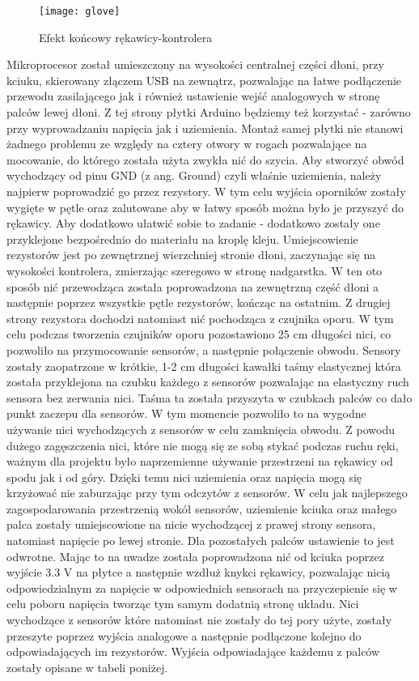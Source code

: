 \begin{figure}[h]
\centering
\texttt{[image: glove]}
\caption{Efekt końcowy rękawicy-kontrolera}
\label{fig:glove}
\end{figure}

Mikroprocesor został umieszczony na wysokości centralnej części dłoni, przy kciuku, skierowany złączem USB na zewnątrz, pozwalając na łatwe podłączenie przewodu zasilającego jak i również ustawienie wejść analogowych w stronę palców lewej dłoni. Z tej strony płytki Arduino będziemy też korzystać - zarówno przy wyprowadzaniu napięcia jak i uziemienia. Montaż samej płytki nie stanowi żadnego problemu ze względy na cztery otwory w rogach pozwalające na mocowanie, do którego została użyta zwykła nić do szycia. Aby stworzyć obwód wychodzący od pinu GND (z ang. Ground) czyli właśnie uziemienia, należy najpierw poprowadzić go przez rezystory. W tym celu wyjścia oporników zostały wygięte w pętle oraz zalutowane aby w łatwy sposób można było je przyszyć do rękawicy. Aby dodatkowo ułatwić sobie to zadanie - dodatkowo zostały one przyklejone bezpośrednio do materiału na kroplę kleju. Umiejscowienie rezystorów jest po zewnętrznej wierzchniej stronie dłoni, zaczynając się na wysokości kontrolera, zmierzając szeregowo w stronę nadgarstka. W ten oto sposób nić przewodząca została poprowadzona na zewnętrzną część dłoni a następnie poprzez wszystkie pętle rezystorów, kończąc na ostatnim. Z drugiej strony rezystora dochodzi natomiast nić pochodząca z czujnika oporu. W tym celu podczas tworzenia czujników oporu pozostawiono 25 cm długości nici, co pozwoliło na przymocowanie sensorów, a następnie połączenie obwodu. Sensory zostały zaopatrzone w krótkie, 1-2 cm długości kawałki taśmy elastycznej która została przyklejona na czubku każdego z sensorów pozwalając na elastyczny ruch sensora bez zerwania nici. Taśma ta została przyszyta w czubkach palców co dało punkt zaczepu dla sensorów. W tym momencie pozwoliło to na wygodne używanie nici wychodzących z sensorów w celu zamknięcia obwodu. Z powodu dużego zagęszczenia nici, które nie mogą się ze sobą stykać podczas ruchu ręki, ważnym dla projektu było naprzemienne używanie przestrzeni na rękawicy od spodu jak i od góry. Dzięki temu nici uziemienia oraz napięcia mogą się krzyżować nie zaburzając przy tym odczytów z sensorów. W celu jak najlepszego zagospodarowania przestrzenią wokół sensorów, uziemienie kciuka oraz małego palca zostały umiejscowione na nicie wychodzącej z prawej strony sensora, natomiast napięcie po lewej stronie. Dla pozostałych palców ustawienie to jest odwrotne. Mając to na uwadze została poprowadzona nić od kciuka poprzez wyjście 3.3 V na płytce a następnie wzdłuż knykci rękawicy, pozwalając nicią odpowiedzialnym za napięcie w odpowiednich sensorach na przyczepienie się w celu poboru napięcia tworząc tym samym dodatnią stronę układu. Nici wychodzące z sensorów które natomiast nie zostały do tej pory użyte, zostały przeszyte poprzez wyjścia analogowe a następnie podłączone kolejno do odpowiadających im rezystorów. Wyjścia odpowiadające każdemu z palców zostały opisane w tabeli poniżej. 

